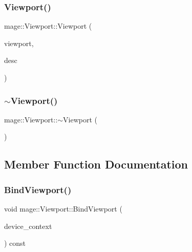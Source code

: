 \hypertarget{classmage_1_1_viewport_a61d8b17ff42b3d78d3b5e9eebff13496}{}\label{classmage_1_1_viewport_a61d8b17ff42b3d78d3b5e9eebff13496} 
\subsubsection{\texorpdfstring{Viewport()}{Viewport()}\hspace{0.1cm}{\footnotesize\ttfamily [11/11]}}
{\footnotesize\ttfamily mage\+::\+Viewport\+::\+Viewport (\begin{DoxyParamCaption}\item[{\hyperlink{classmage_1_1_viewport}{Viewport} \&\&}]{viewport,  }\item[{\hyperlink{namespacemage_a86cd40b8f2f42ca4d616cc6ec665a7f2}{A\+A\+Descriptor}}]{desc }\end{DoxyParamCaption})\hspace{0.3cm}{\ttfamily [explicit]}}

\hypertarget{classmage_1_1_viewport_a6fcf68e154b186d5c6241c495cc93fe5}{}\label{classmage_1_1_viewport_a6fcf68e154b186d5c6241c495cc93fe5} 
\subsubsection{\texorpdfstring{$\sim$\+Viewport()}{~Viewport()}}
{\footnotesize\ttfamily mage\+::\+Viewport\+::$\sim$\+Viewport (\begin{DoxyParamCaption}{ }\end{DoxyParamCaption})\hspace{0.3cm}{\ttfamily [default]}}



\subsection{Member Function Documentation}
\hypertarget{classmage_1_1_viewport_a90dc0a655ae756c85085b12c6442b8c3}{}\label{classmage_1_1_viewport_a90dc0a655ae756c85085b12c6442b8c3} 
\subsubsection{\texorpdfstring{Bind\+Viewport()}{BindViewport()}}
{\footnotesize\ttfamily void mage\+::\+Viewport\+::\+Bind\+Viewport (\begin{DoxyParamCaption}\item[{I\+D3\+D11\+Device\+Context2 $\ast$}]{device\+\_\+context }\end{DoxyParamCaption}) const\hspace{0.3cm}{\ttfamily [noexcept]}}

